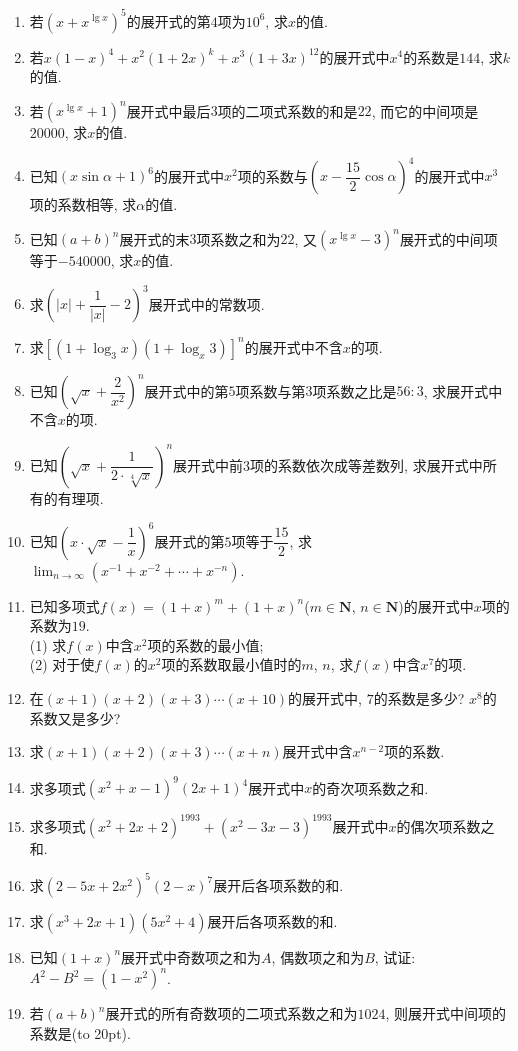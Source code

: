 \documentclass[10pt,a4paper]{article}
\newcommand{\bracket}[1]{(\hbox to #1pt{})}
\begin{document}
\begin{enumerate}[1.]
\item 若$(x+x^{\lg x})^5$的展开式的第$4$项为$10^6$, 求$x$的值.
\item 若$x(1-x)^4+x^2(1+2x)^k+x^3(1+3x)^{12}$的展开式中$x^4$的系数是$144$, 求$k$的值.
\item 若$(x^{\lg x}+1)^n$展开式中最后$3$项的二项式系数的和是$22$, 而它的中间项是$20000$, 求$x$的值.
\item 已知$(x\sin \alpha +1)^6$的展开式中$x^2$项的系数与$(x-\dfrac{15}2\cos \alpha)^4$的展开式中$x^3$项的系数相等, 求$\alpha$的值.
\item 已知$(a+b)^n$展开式的末$3$项系数之和为$22$, 又$(x^{\lg x}-3)^n$展开式的中间项等于$-540000$, 求$x$的值.
\item 求$(|x|+\dfrac 1{|x|}-2)^3$展开式中的常数项.
\item 求$[(1+\log _3x)(1+\log _x3)]^n$的展开式中不含$x$的项.
\item 已知$(\sqrt x+\dfrac 2{x^2})^n$展开式中的第$5$项系数与第$3$项系数之比是$56:3$, 求展开式中不含$x$的项.
\item 已知$(\sqrt x+\dfrac 1{2\cdot \sqrt[4]x})^n$展开式中前$3$项的系数依次成等差数列, 求展开式中所有的有理项.
\item 已知$(x\cdot \sqrt x-\dfrac 1x)^6$展开式的第$5$项等于$\dfrac{15}2$, 求$\displaystyle\lim_{n\to\infty} (x^{-1}+x^{-2}+\cdots +x^{-n})$.
\item 已知多项式$f(x)=(1+x)^m+(1+x)^n$($m\in \mathbf{N}$, $n\in \mathbf{N}$)的展开式中$x$项的系数为$19$.\\
(1) 求$f(x)$中含$x^2$项的系数的最小值;\\
(2) 对于使$f(x)$的$x^2$项的系数取最小值时的$m$, $n$, 求$f(x)$中含$x^7$的项.
\item 在$(x+1)(x+2)(x+3)\cdots (x+10)$的展开式中, $7$的系数是多少? $x^8$的系数又是多少?
\item 求$(x+1)(x+2)(x+3)\cdots (x+n)$展开式中含$x^{n-2}$项的系数.
\item 求多项式$(x^2+x-1)^9(2x+1)^4$展开式中$x$的奇次项系数之和.
\item 求多项式$(x^2+2x+2)^{1993}+(x^2-3x-3)^{1993}$展开式中$x$的偶次项系数之和.
\item 求$(2-5x+2x^2)^5(2-x)^7$展开后各项系数的和.
\item 求$(x^3+2x+1)(5x^2+4)$展开后各项系数的和.
\item 已知$(1+x)^n$展开式中奇数项之和为$A$, 偶数项之和为$B$, 试证: $A^2-B^2=(1-x^2)^n$.
\item 若$(a+b)^n$展开式的所有奇数项的二项式系数之和为$1024$, 则展开式中间项的系数是\bracket{20}.

\end{enumerate}
\end{document}
